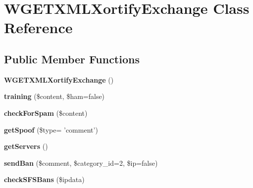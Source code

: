 \hypertarget{class_w_g_e_t_x_m_l_xortify_exchange}{\section{W\-G\-E\-T\-X\-M\-L\-Xortify\-Exchange Class Reference}
\label{class_w_g_e_t_x_m_l_xortify_exchange}
}
\subsection*{Public Member Functions}
\begin{DoxyCompactItemize}
\item 
\hypertarget{class_w_g_e_t_x_m_l_xortify_exchange_a201100644e11ea31c7f0b6b4380d6909}{{\bfseries W\-G\-E\-T\-X\-M\-L\-Xortify\-Exchange} ()}\label{class_w_g_e_t_x_m_l_xortify_exchange_a201100644e11ea31c7f0b6b4380d6909}

\item 
\hypertarget{class_w_g_e_t_x_m_l_xortify_exchange_aadd416bb5ea9f6c84955445068ece28c}{{\bfseries training} (\$content, \$ham=false)}\label{class_w_g_e_t_x_m_l_xortify_exchange_aadd416bb5ea9f6c84955445068ece28c}

\item 
\hypertarget{class_w_g_e_t_x_m_l_xortify_exchange_a77815c9cd362a74d2da7c8b8eac5d050}{{\bfseries check\-For\-Spam} (\$content)}\label{class_w_g_e_t_x_m_l_xortify_exchange_a77815c9cd362a74d2da7c8b8eac5d050}

\item 
\hypertarget{class_w_g_e_t_x_m_l_xortify_exchange_a1b837fcffcaff011b20480b1618e3c8e}{{\bfseries get\-Spoof} (\$type= 'comment')}\label{class_w_g_e_t_x_m_l_xortify_exchange_a1b837fcffcaff011b20480b1618e3c8e}

\item 
\hypertarget{class_w_g_e_t_x_m_l_xortify_exchange_a90b81e57f7ac69ff7aa3b5a0987854ba}{{\bfseries get\-Servers} ()}\label{class_w_g_e_t_x_m_l_xortify_exchange_a90b81e57f7ac69ff7aa3b5a0987854ba}

\item 
\hypertarget{class_w_g_e_t_x_m_l_xortify_exchange_ae566833d66544c7b899c0a9dc961ceae}{{\bfseries send\-Ban} (\$comment, \$category\-\_\-id=2, \$ip=false)}\label{class_w_g_e_t_x_m_l_xortify_exchange_ae566833d66544c7b899c0a9dc961ceae}

\item 
\hypertarget{class_w_g_e_t_x_m_l_xortify_exchange_a7735548a0a76487abd8a96be0b364900}{{\bfseries check\-S\-F\-S\-Bans} (\$ipdata)}\label{class_w_g_e_t_x_m_l_xortify_exchange_a7735548a0a76487abd8a96be0b364900}


\end{DoxyCompactItemize}
